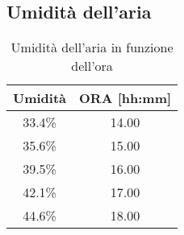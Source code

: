 \begin{appendices}
\section{Umidità dell'aria}

\begin{table}[H]
	\centering
	\begin{tabular}{|c|c|} \hline
		\textbf{Umidità} & \textbf{ORA {[hh:mm]} }  \\ \hline
		33.4\% & 14.00  \\ \hline
		35.6\% & 15.00  \\ \hline
		39.5\% & 16.00  \\ \hline
		42.1\% & 17.00  \\ \hline
		44.6\% & 18.00  \\ \hline
	\end{tabular}
	\caption{Umidità dell'aria in funzione dell'ora}
\end{table}



\end{appendices}
